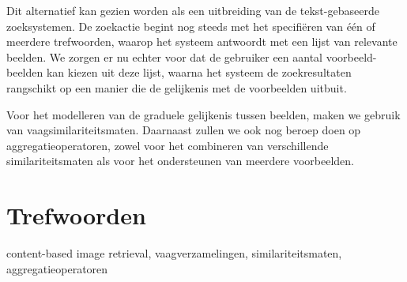 Dit alternatief kan gezien worden als een uitbreiding van de tekst-gebaseerde zoeksystemen.
De zoekactie begint nog steeds met het specifi\"eren van \'e\'en of meerdere trefwoorden, waarop
het systeem antwoordt met een lijst van relevante beelden. We zorgen er nu echter voor
dat de gebruiker een aantal voorbeeld-beelden kan kiezen uit deze lijst, waarna het
systeem de zoekresultaten rangschikt op een manier die de gelijkenis met de voorbeelden uitbuit.

Voor het modelleren van de graduele gelijkenis tussen beelden, maken we gebruik van 
vaagsimilariteitsmaten. Daarnaast zullen we ook nog beroep doen op aggregatieoperatoren,
zowel voor het combineren van verschillende similariteitsmaten als voor het ondersteunen van
meerdere voorbeelden. 

\section*{Trefwoorden}
content-based image retrieval, vaagverzamelingen, similariteitsmaten, aggregatieoperatoren

